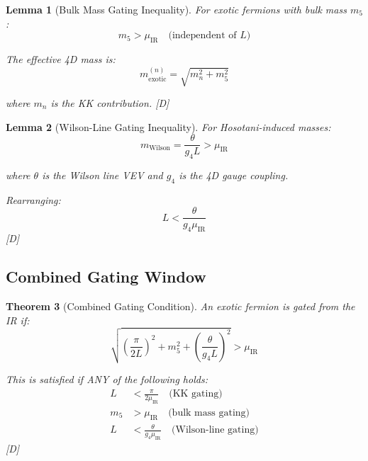 \documentclass[11pt,a4paper]{article}
\newtheorem{theorem}{Theorem}[section]
\newtheorem{lemma}[theorem]{Lemma}
\newcommand{\tagD}{\textcolor{blue!70!black}{[D]}}
\begin{document}
\begin{lemma}[Bulk Mass Gating Inequality]
\label{lem:bulk-gating}
For exotic fermions with bulk mass $m_5$:
\begin{equation}
\label{eq:bulk-gate-ineq}
m_5 > \mu_{\text{IR}} \quad \text{(independent of } L \text{)}
\end{equation}

The effective 4D mass is:
\begin{equation}
\label{eq:bulk-4d-mass}
m_{\text{exotic}}^{(n)} = \sqrt{m_n^2 + m_5^2}
\end{equation}

where $m_n$ is the KK contribution.
\tagD
\end{lemma}

\begin{lemma}[Wilson-Line Gating Inequality]
\label{lem:wilson-gating}
For Hosotani-induced masses:
\begin{equation}
\label{eq:wilson-gate-ineq}
m_{\text{Wilson}} = \frac{\theta}{g_4 L} > \mu_{\text{IR}}
\end{equation}

where $\theta$ is the Wilson line VEV and $g_4$ is the 4D gauge coupling.

Rearranging:
\begin{equation}
\label{eq:wilson-gate-L}
L < \frac{\theta}{g_4 \mu_{\text{IR}}}
\end{equation}
\tagD
\end{lemma}

\subsection{Combined Gating Window}

\begin{theorem}[Combined Gating Condition]
\label{thm:combined-gating}
An exotic fermion is gated from the IR if:
\begin{equation}
\label{eq:combined-gate}
\sqrt{\left(\frac{\pi}{2L}\right)^2 + m_5^2 + \left(\frac{\theta}{g_4 L}\right)^2} > \mu_{\text{IR}}
\end{equation}

This is satisfied if ANY of the following holds:
\begin{align}
\label{eq:combined-1}
L &< \frac{\pi}{2\mu_{\text{IR}}} \quad \text{(KK gating)} \\
\label{eq:combined-2}
m_5 &> \mu_{\text{IR}} \quad \text{(bulk mass gating)} \\
\label{eq:combined-3}
L &< \frac{\theta}{g_4 \mu_{\text{IR}}} \quad \text{(Wilson-line gating)}
\end{align}
\tagD
\end{theorem}
\end{document}
